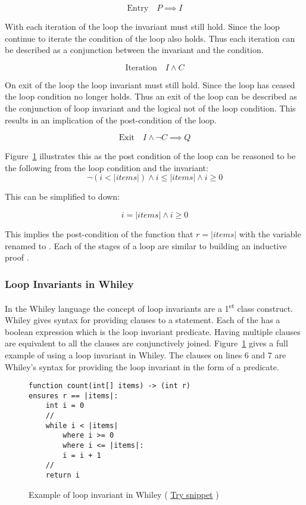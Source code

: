 $$\text{Entry} \quad P \implies I$$

With each iteration of the loop the invariant must still hold.
Since the loop continue to iterate the condition of the loop
also holds. Thus each iteration can be described as a conjunction
between the invariant and the condition.

$$\text{Iteration} \quad I \wedge C $$

On exit of the loop the loop invariant must still hold.
Since the loop has ceased the loop condition no longer
holds. Thus an exit of the loop can be described
as the conjunction of loop invariant and the logical
not of the loop condition.
This results in an implication of the post-condition of the
loop.

$$\text{Exit} \quad I \wedge \neg{C} \implies Q$$

Figure~\ref{lst:whiley-inv} illustrates this as the
post condition of the loop can be reasoned to be the following
from the loop condition and the invariant:
$$\neg{ ( i < |items| ) } \wedge i \leq |items| \wedge i \geq 0$$

This can be simplified to down:

$$ i = |items| \wedge i \geq 0$$

This implies the post-condition of the function that $r = |items|$ with
the variable  renamed to .
Each of the stages of a loop are similar to building an inductive proof \cite{invarints-classifiction}.

\subsubsection{Loop Invariants in Whiley}

In the Whiley language the concept of loop invariants are a 1\textsuperscript{st} class
construct.
Whiley gives syntax for providing  clauses to a 
statement.
Each of the  has a boolean expression which is the loop
invariant predicate.
Having multiple  clauses are equivalent to all the clauses are
conjunctively joined.
Figure~\ref{lst:whiley-inv} gives a full example of using a loop invariant
in Whiley. The  clauses on lines 6 and 7 are Whiley's syntax for
providing the loop invariant in the form of a predicate.

\begin{figure}[ht]
\begin{lstlisting}
function count(int[] items) -> (int r)
ensures r == |items|:
    int i = 0
    //
    while i < |items|
        where i >= 0
        where i <= |items|:
        i = i + 1
    //
    return i
\end{lstlisting}
    \caption{Example of loop invariant in Whiley (
    \href{http://whiley.org/play/?id=DzLm1T}{Try snippet} ) }
    \label{lst:whiley-inv}
\end{figure}

